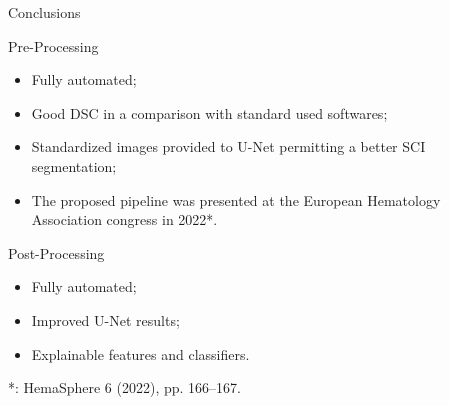 \documentclass[]{standalone}
\begin{document}
	\begin{frame}{Conclusions}{}
	\vspace{-5pt}
	\begin{block}{Pre-Processing}
	\footnotesize
	\begin{itemize}
		\item Fully automated;
		\item Good DSC in a comparison with standard used softwares;
		\item Standardized images provided to U-Net permitting a better SCI segmentation;
		\item The proposed pipeline was presented at the European Hematology Association congress in 2022*.
	\end{itemize}
	\end{block}
	
	\begin{exampleblock}{Post-Processing}
	\footnotesize
	\begin{itemize}
		\item Fully automated;
		\item Improved U-Net results;
		\item Explainable features and classifiers.
	\end{itemize}
	\end{exampleblock}
	
	\vspace{5pt}
	\tiny
	*: HemaSphere 6 (2022), pp. 166–167.
	\end{frame}
\end{document}
